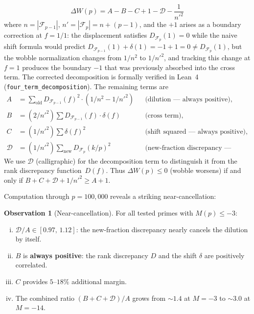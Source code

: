 \documentclass[11pt]{article}
\theoremstyle{definition}
\newtheorem{observation}[theorem]{Observation}
\newcommand{\F}{\mathcal{F}}
\begin{document}
\begin{equation}\label{eq:4term}
  \Delta W(p) = A - B - C + 1 - \mathcal{D} - \frac{1}{{n'}^2}
\end{equation}
where $n = |\F_{p-1}|$, $n' = |\F_p| = n + (p-1)$, and the
$+1$ arises as a boundary correction at $f = 1/1$: the
displacement satisfies $D_{\F_p}(1) = 0$ while the naive
shift formula would predict
$D_{\F_{p-1}}(1) + \delta(1) = -1 + 1 = 0 \ne D_{\F_p}(1)$,
but the wobble normalization changes from $1/n^2$ to
$1/{n'}^2$, and tracking this change at $f = 1$ produces
the boundary $-1$ that was previously absorbed into the
cross term.  The corrected decomposition is formally verified
in Lean~4 (\texttt{four\_term\_decomposition}).  The remaining
terms are
\begin{align*}
  A &= \textstyle\sum_{\text{old}} D_{\F_{p-1}}(f)^2 \cdot
       (1/n^2 - 1/{n'}^2) && \text{(dilution --- always positive),}\\
  B &= (2/{n'}^2)\textstyle\sum D_{\F_{p-1}}(f) \cdot \delta(f)
       && \text{(cross term),}\\
  C &= (1/{n'}^2)\textstyle\sum \delta(f)^2
       && \text{(shift squared --- always positive),}\\
  \mathcal{D} &= (1/{n'}^2)\textstyle\sum_{\text{new}} D_{\F_p}(k/p)^2
       && \text{(new-fraction discrepancy --- always positive).}
\end{align*}
We use $\mathcal{D}$ (calligraphic) for the decomposition term to
distinguish it from the rank discrepancy function~$D(f)$.
Thus $\Delta W(p) \le 0$ (wobble worsens) if and only if
$B + C + \mathcal{D} + 1/{n'}^2 \ge A + 1$.

Computation through $p = 100{,}000$ reveals a striking near-cancellation:

\begin{observation}[Near-cancellation]\label{obs:near-cancel}
For all tested primes with $M(p) \le -3$:
\begin{enumerate}[(i)]
  \item $\mathcal{D}/A \in [0.97,\, 1.12]$: the new-fraction discrepancy nearly
    cancels the dilution by itself.
  \item $B$ is \textbf{always positive}: the rank discrepancy $D$ and
    the shift $\delta$ are positively correlated.
  \item $C$ provides $5$--$18\%$ additional margin.
  \item The combined ratio $(B + C + \mathcal{D})/A$ grows from ${\sim}1.4$ at
    $M = -3$ to ${\sim}3.0$ at $M = -14$.
\end{enumerate}
\end{observation}
\end{document}
